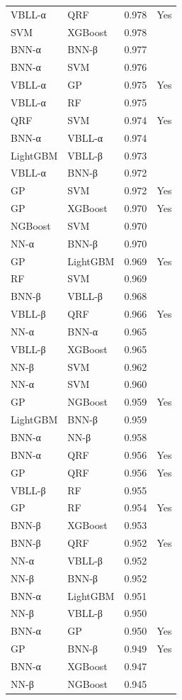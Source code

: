 \begin{tabular}{llrl}
VBLL-α & QRF & 0.978 & Yes \\
SVM & XGBoost & 0.978 &  \\
BNN-α & BNN-β & 0.977 &  \\
BNN-α & SVM & 0.976 &  \\
VBLL-α & GP & 0.975 & Yes \\
VBLL-α & RF & 0.975 &  \\
QRF & SVM & 0.974 & Yes \\
BNN-α & VBLL-α & 0.974 &  \\
LightGBM & VBLL-β & 0.973 &  \\
VBLL-α & BNN-β & 0.972 &  \\
GP & SVM & 0.972 & Yes \\
GP & XGBoost & 0.970 & Yes \\
NGBoost & SVM & 0.970 &  \\
NN-α & BNN-β & 0.970 &  \\
GP & LightGBM & 0.969 & Yes \\
RF & SVM & 0.969 &  \\
BNN-β & VBLL-β & 0.968 &  \\
VBLL-β & QRF & 0.966 & Yes \\
NN-α & BNN-α & 0.965 &  \\
VBLL-β & XGBoost & 0.965 &  \\
NN-β & SVM & 0.962 &  \\
NN-α & SVM & 0.960 &  \\
GP & NGBoost & 0.959 & Yes \\
LightGBM & BNN-β & 0.959 &  \\
BNN-α & NN-β & 0.958 &  \\
BNN-α & QRF & 0.956 & Yes \\
GP & QRF & 0.956 & Yes \\
VBLL-β & RF & 0.955 &  \\
GP & RF & 0.954 & Yes \\
BNN-β & XGBoost & 0.953 &  \\
BNN-β & QRF & 0.952 & Yes \\
NN-α & VBLL-β & 0.952 &  \\
NN-β & BNN-β & 0.952 &  \\
BNN-α & LightGBM & 0.951 &  \\
NN-β & VBLL-β & 0.950 &  \\
BNN-α & GP & 0.950 & Yes \\
GP & BNN-β & 0.949 & Yes \\
BNN-α & XGBoost & 0.947 &  \\
NN-β & NGBoost & 0.945 &  \\

\end{tabular}
